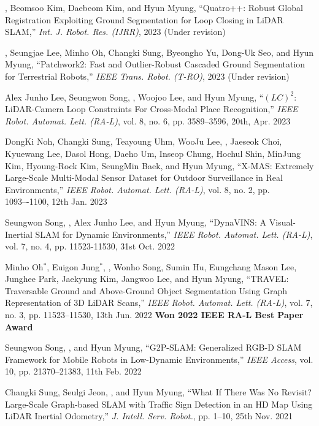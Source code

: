 \begin{pubSubsectionNum}
    \item {\hyungtaelim, Beomsoo Kim, Daebeom Kim, and Hyun Myung, ``Quatro++: Robust Global Registration Exploiting Ground Segmentation for Loop Closing in LiDAR SLAM,'' \textit{Int. J. Robot. Res. (IJRR)}, 2023 (Under revision)}
    \item {\hyungtaelim, Seungjae Lee, Minho Oh, Changki Sung, Byeongho Yu, Dong-Uk Seo, and Hyun Myung, ``Patchwork2: Fast and Outlier-Robust Cascaded Ground Segmentation for Terrestrial Robots,'' \textit{IEEE Trans. Robot. (T-RO)}, 2023 (Under revision)}
    \item Alex Junho Lee, Seungwon Song, \hyungtaelim, Woojoo Lee, and Hyun Myung, ``$(LC)^2$: LiDAR-Camera Loop Constraints For Cross-Modal Place Recognition,'' \textit{IEEE Robot. Automat. Lett. (RA-L)}, vol. 8, no. 6, pp. 3589--3596, 20th, Apr. 2023
    \item DongKi Noh, Changki Sung, Teayoung Uhm, WooJu Lee, \hyungtaelim, Jaeseok Choi, Kyuewang Lee, Dasol Hong, Daeho Um, Inseop Chung, Hochul Shin, MinJung Kim, Hyoung-Rock Kim, SeungMin Baek, and Hyun Myung, ``X-MAS: Extremely Large-Scale Multi-Modal Sensor Dataset for Outdoor Surveillance in Real Environments,'' \textit{IEEE Robot. Automat. Lett. (RA-L)}, vol. 8, no. 2, pp. 1093–-1100, 12th Jan. 2023
    \item Seungwon Song, \hyungtaelim, Alex Junho Lee, and Hyun Myung, ``DynaVINS: A Visual-Inertial SLAM for Dynamic Environments,'' \textit{IEEE Robot. Automat. Lett. (RA-L)}, vol. 7, no. 4, pp. 11523-11530, 31st Oct. 2022
    \item Minho Oh$^*$, Euigon Jung$^*$, \hyungtaelim, Wonho Song, Sumin Hu, Eungchang Mason Lee, Junghee Park, Jaekyung Kim, Jangwoo Lee, and Hyun Myung, ``TRAVEL: Traversable Ground and Above-Ground Object Segmentation Using Graph Representation of 3D LiDAR Scans,'' \textit{IEEE Robot. Automat. Lett. (RA-L)}, vol. 7, no. 3, pp. 11523--11530, 13th Jun. 2022 \textbf{Won 2022 IEEE RA-L Best Paper Award}
    \item Seungwon Song, \hyungtaelim, and Hyun Myung, ``G2P-SLAM: Generalized RGB-D SLAM Framework for Mobile Robots in Low-Dynamic Environments,'' \textit{IEEE Access}, vol. 10, pp. 21370--21383, 11th Feb. 2022
    \item Changki Sung, Seulgi Jeon, \hyungtaelim, and Hyun Myung, ``What If There Was No Revisit? Large-Scale Graph-based SLAM with Traffic Sign Detection in an HD Map Using LiDAR Inertial Odometry,'' \textit{J. Intell. Serv. Robot.}, pp. 1--10, 25th Nov. 2021

\end{pubSubsectionNum}
